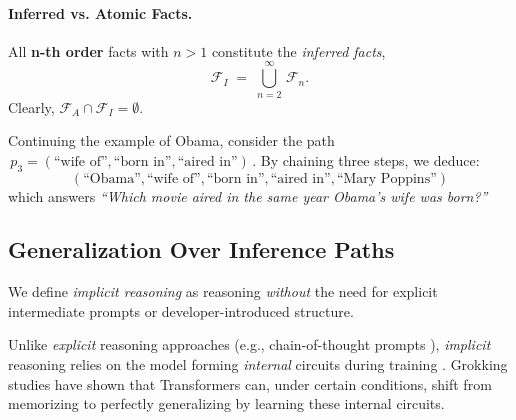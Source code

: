         \paragraph{Inferred vs. Atomic Facts.}
            \begin{definition}
                \label{def:inferred_facts}
                All \textbf{n-th order} facts with \(n>1\) constitute the \emph{inferred facts},
                \[
                    \mathcal{F}_I \;=\; \bigcup_{n=2}^{\infty} \,\mathcal{F}_n.
                \]
                Clearly, \(\mathcal{F}_A \cap \mathcal{F}_I = \emptyset\).
            \end{definition}
            
            \begin{example}
                \label{ex:3hop_marypoppins}
                Continuing the example of Obama, consider the path 
                \(\,p_3 = (\text{``wife of''}, \text{``born in''}, \text{``aired in''})\,\).
                By chaining three steps, we deduce:
                {\small
                \[
                    (\text{``Obama''}, \text{``wife of''}, \text{``born in''}, 
                      \text{``aired in''}, \text{``Mary Poppins''})
                \]}%
                which answers \emph{``Which movie aired in the same year Obama’s wife was born?''}
            \end{example}
    
    \subsection{Generalization Over Inference Paths}
        \label{subsec:generalization_paths}
        
        \begin{definition}
            \label{def:implicit_reasoning}
            We define \emph{implicit reasoning} as reasoning \emph{without} the need for explicit intermediate prompts or developer-introduced structure.
        \end{definition}
        
        Unlike \emph{explicit} reasoning approaches (e.g., chain-of-thought prompts \citep{plaat2024reasoning}), \emph{implicit} reasoning relies on the model forming \emph{internal} circuits during training \citep{nanda2023progress}. Grokking studies \citep{power2022grokking,wang_grokked_2024} have shown that Transformers can, under certain conditions, shift from memorizing to perfectly generalizing by learning these internal circuits.
        
